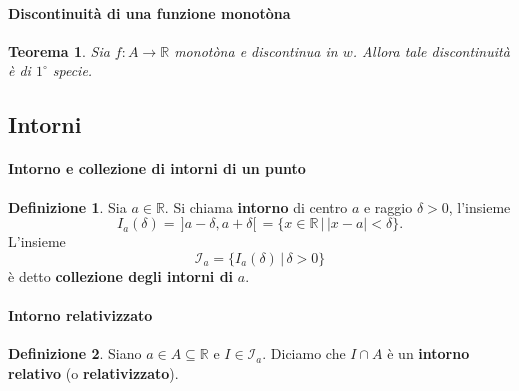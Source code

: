 \documentclass{article}
\theoremstyle{plain}
\newtheorem{thm}{Teorema}[section]
\theoremstyle{definition}
\newtheorem{defn}{Definizione}[section]
\theoremstyle{remark}
\begin{document}
\vspace{10pt}

\paragraph{Discontinuità di una funzione monotòna}
\begin{bxthm}
\begin{thm}
    Sia $f:A\to\mathbb{R}$ monotòna e discontinua in $w$. Allora tale discontinuità è di $1^\circ$ specie.
\end{thm}
\end{bxthm}

\vspace{10pt}

\subsection{Intorni}

\vspace{10pt}

\paragraph{Intorno e collezione di intorni di un punto}
\begin{bxthm}
\begin{defn}
    Sia $a\in\mathbb{R}$. Si chiama \textbf{intorno} di centro $a$ e raggio $\delta>0$, l'insieme 
    \[I_a(\delta)=\,]a-\delta,a+\delta[\,=\{x\in\mathbb{R} \,|\, |x-a|<\delta\}.\]
    L'insieme \[\mathcal{I}_a=\{I_a(\delta) \,|\, \delta>0\}\] è detto \textbf{collezione degli intorni di} $a$.
\end{defn}
\end{bxthm}

\vspace{10pt}

\paragraph{Intorno relativizzato}
\begin{bxthm}
\begin{defn}
    Siano $a\in A\subseteq\mathbb{R}$ e $I\in \mathcal{I}_a$. Diciamo che $I\cap A$ è un \textbf{intorno relativo} (o \textbf{relativizzato}).
\end{defn}
\end{bxthm}

\vspace{10pt}
\end{document}

